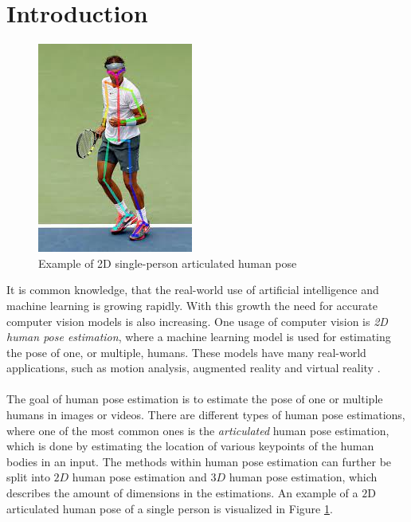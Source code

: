 \documentclass[./main.tex]{subfiles}
\begin{document}
\section{Introduction}
\begin{figure}[htbp]
    \centering
    \includegraphics[height = 6 cm]{./entities/pose_estimation_example_img.jpg}
    \caption{Example of 2D single-person articulated human pose \cite{pose_estimation_example}}
    \label{fig:pose_estimation_example_fig}
\end{figure}
\noindent It is common knowledge, that the real-world use of artificial intelligence and machine learning is growing rapidly. With this growth the need for accurate computer vision models is also increasing. One usage of computer vision is \textit{2D human pose estimation}, where a machine learning model is used for estimating the pose of one, or multiple, humans. These models have many real-world applications, such as motion analysis, augmented reality and virtual reality \cite{survey_2}.
\\
\\
The goal of human pose estimation is to estimate the pose of one or multiple humans in images or videos. There are different types of human pose estimations, where one of the most common ones is the \textit{articulated} human pose estimation, which is done by estimating the location of various keypoints of the human bodies in an input. The methods within human pose estimation can further be split into $2D$ human pose estimation and $3D$ human pose estimation, which describes the amount of dimensions in the estimations. An example of a $2$D articulated human pose of a single person is visualized in Figure \ref{fig:pose_estimation_example_fig}.
\\
\\
\end{document}
